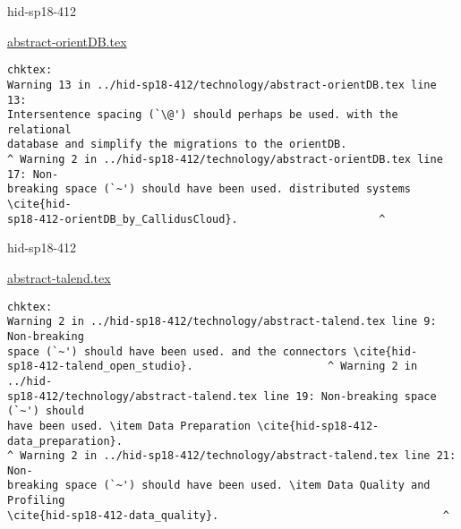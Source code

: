 \begin{IU}

hid-sp18-412

\href{https://github.com/cloudmesh-community/hid-sp18-412/blob/master//technology/abstract-orientDB.tex}{abstract-orientDB.tex}

\begin{tiny}
\begin{verbatim}
chktex:
Warning 13 in ../hid-sp18-412/technology/abstract-orientDB.tex line 13:
Intersentence spacing (`\@') should perhaps be used. with the relational
database and simplify the migrations to the orientDB.
^ Warning 2 in ../hid-sp18-412/technology/abstract-orientDB.tex line 17: Non-
breaking space (`~') should have been used. distributed systems \cite{hid-
sp18-412-orientDB_by_CallidusCloud}.                      ^
\end{verbatim}
\end{tiny}
\end{IU}



\begin{IU}

hid-sp18-412

\href{https://github.com/cloudmesh-community/hid-sp18-412/blob/master//technology/abstract-talend.tex}{abstract-talend.tex}

\begin{tiny}
\begin{verbatim}
chktex:
Warning 2 in ../hid-sp18-412/technology/abstract-talend.tex line 9: Non-breaking
space (`~') should have been used. and the connectors \cite{hid-
sp18-412-talend_open_studio}.                     ^ Warning 2 in ../hid-
sp18-412/technology/abstract-talend.tex line 19: Non-breaking space (`~') should
have been used. \item Data Preparation \cite{hid-sp18-412-data_preparation}.
^ Warning 2 in ../hid-sp18-412/technology/abstract-talend.tex line 21: Non-
breaking space (`~') should have been used. \item Data Quality and Profiling
\cite{hid-sp18-412-data_quality}.                                   ^
\end{verbatim}
\end{tiny}
\end{IU}



